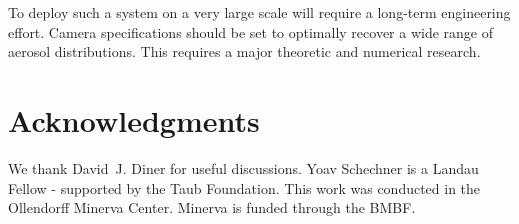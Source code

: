 \documentclass[10pt,letterpaper]{article}
\begin{document}
To deploy such a system on a very large scale will require a long-term engineering effort. Camera specifications should be set to optimally recover a wide range of
aerosol distributions. This requires a major theoretic and numerical
research.  


\section*{Acknowledgments}
\label{sec:acknowledgments}

We thank David~J. Diner for useful
discussions. Yoav Schechner is a Landau Fellow - supported by the Taub
Foundation. This work was conducted in the Ollendorff Minerva
Center. Minerva is funded through the BMBF.
\end{document}
